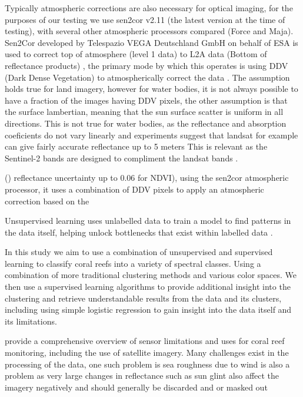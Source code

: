 \documentclass[journal,article,submit,pdftex,moreauthors]{Definitions/mdpi}
\begin{document}
Typically atmospheric corrections are also necessary for optical imaging, for the purposes of our testing we use sen2cor v2.11 (the latest version at the time of testing), with several other atmospheric processors compared (Force and Maja).
Sen2Cor developed by Telespazio VEGA Deutschland GmbH on behalf of ESA is used to correct top of atmosphere (level 1 data) to L2A data (Bottom of reflectance products) \cite{sen2cor_proceedings}, the primary mode by which this operates is using DDV (Dark Dense Vegetation) 
to atmospherically correct the data \cite{atmospheric_correction1988}. The assumption holds true for land imagery, however for water bodies, it is not always possible to have a fraction of the images having DDV pixels, the other assumption is that the surface lambertian, 
meaning that the sun surface scatter is uniform in all directions. This is not true for water bodies, as the reflectance and absorption coeficients do not vary linearly \cite{whitlock1981comparison} and experiments suggest that landsat for example can give fairly
accurate reflectance up to 5 meters \cite{lyzenga1981remote} This is relevant as the Sentinel-2 bands are designed to compliment the landsat bands \cite{drusch2012sentinel}. 





()\cite{louis2016sentinel} reflectance uncertainty up to 0.06 for NDVI), using the sen2cor atmospheric processor, it uses a combination of DDV  pixels to apply an atmospheric correction based on the \cite{atmospheric_correction1988}

Unsupervised learning uses unlabelled data to train a model to find patterns in the data itself, helping unlock bottlenecks that exist within labelled data \cite{usama2019unsupervised}.

In this study we aim to use a combination of unsupervised and supervised learning to classify coral reefs into a variety of spectral classes. Using a combination of more traditional clustering methods and various color spaces. 
We then use a supervised learning algorithms to provide additional insight into the clustering and 
retrieve understandable results from the data and its clusters, including using simple logistic regression to gain insight into the data itself and its limitations.

\citep{Hedley2016} provide a comprehensive overview of sensor limitations and uses for coral reef monitoring, including the use of satellite imagery. Many challenges exist in the processing of the data, one such problem is 
sea roughness due to wind is also a problem as very large changes in reflectance such as sun glint also affect the imagery negatively  and should generally be discarded and or masked out \cite{gordon1997atmospheric}
\end{document}
